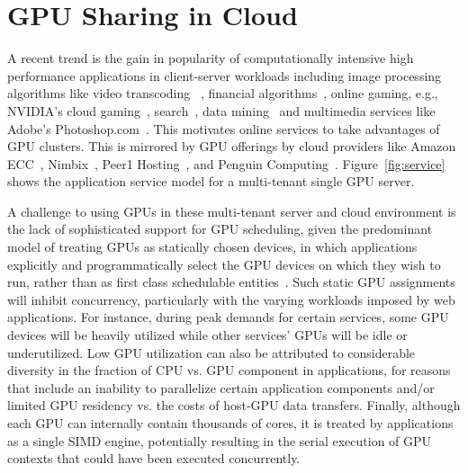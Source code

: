 \section{GPU Sharing in Cloud}
A recent trend is the gain in popularity of computationally intensive high performance applications in client-server workloads including image processing algorithms like video transcoding~\cite{element} , financial algorithms~\cite{zillians}, online gaming, e.g., NVIDIA’s cloud gaming~\cite{nvidia-game}, search~\cite{GPUsearch}, data mining~\cite{GPUmine} and multimedia services like Adobe’s Photoshop.com~\cite{adobe}. This motivates online services to take advantages of GPU clusters. This is mirrored by GPU offerings by cloud providers like Amazon ECC~\cite{amazon}, Nimbix~\cite{nimbix}, Peer1 Hosting~\cite{peer1}, and Penguin Computing~\cite{penguin}.  Figure~\ref{fig:service} shows the application service model for a multi-tenant single GPU server.

A challenge to using GPUs in these multi-tenant server and cloud environment is the lack of sophisticated support for GPU scheduling, given the predominant model of treating GPUs as statically chosen devices, in which applications explicitly and programmatically select the GPU devices on which they wish to run, rather than as first class schedulable entities~\cite{pegasus}. Such static GPU assignments will inhibit concurrency, particularly with the varying workloads imposed by web applications. For instance, during peak demands for certain services, some GPU devices will be heavily utilized while other services’ GPUs will be idle or underutilized. Low GPU utilization can also be attributed to considerable diversity in the fraction of CPU vs. GPU component in applications, for reasons that include an inability to parallelize certain application components and/or limited GPU residency vs. the costs of host-GPU data transfers. Finally, although each GPU can internally contain thousands of cores, it is treated by applications as a single SIMD engine, potentially resulting in the serial execution of GPU contexts that could have been executed concurrently.

